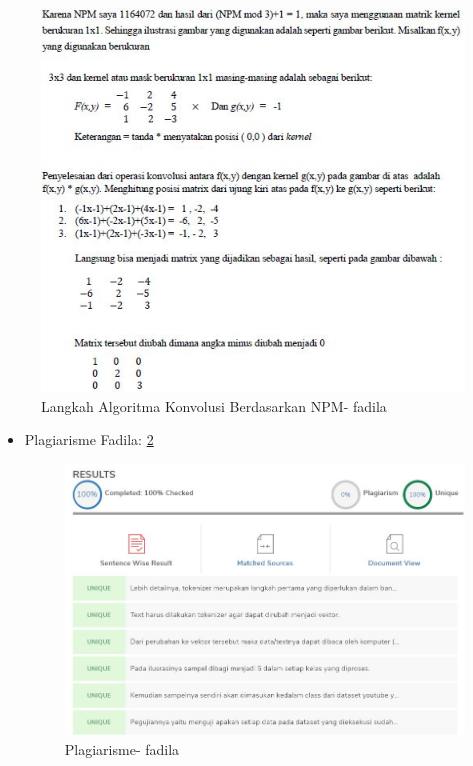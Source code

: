 \begin{enumerate}
\begin{itemize}
\begin{figure}[!hbtp]
\includegraphics[scale=0.52]{figures/chapter-7-algoritma-konvolusi-fadila.jpg}
\caption{Langkah Algoritma Konvolusi Berdasarkan NPM- fadila}
\label{chapter-7-algoritma-konvolusi-fadila}
\end{figure}
\par
\par
\end{itemize}
\end{enumerate}

\begin{itemize}
\item  Plagiarisme Fadila: \ref{chapter-7-plagiarisme-fadila}
\par
\begin{figure}[!hbtp]
\centering
\includegraphics[scale=0.3]{figures/chapter-7-plagiarisme-fadila.jpg}
\caption{Plagiarisme- fadila}
\label{chapter-7-plagiarisme-fadila}
\end{figure}
\par
\par
\end{itemize}
